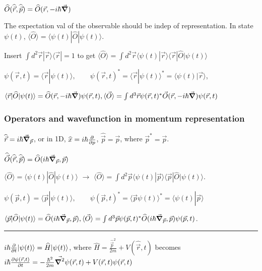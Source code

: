 $\widehat{O}(\widehat{\vec{r}}, \widehat{\vec{p}}) = \widehat{O} (\vec{r}, -i \hbar \vec{\grad})$

The expectation val of the observable should be indep of representation. In state $\psi(t)$, $\langle \widehat{O} \rangle = \langle \psi(t) | \widehat{O} | \psi(t) \rangle$.

Insert $\int d^2 \vec{r} | \vec{r} \rangle \langle \vec{r} | = 1$ to get $\langle \widehat{O} \rangle = \int d^2 \vec{r} \langle \psi(t) | \vec{r} \rangle \langle \vec{r} | \widehat{O} | \psi(t) \rangle$

$\psi(\vec{r}, t) = \langle \vec{r} | \psi(t) \rangle, \qquad \psi(\vec{r}, t)^* = \langle \vec{r} | \psi(t) \rangle^* = \langle \psi(t) | \vec{r} \rangle$,

$\langle \vec{r} | \widehat{O} | \psi(t) \rangle = \widehat{O} (\vec{r}, -i \hbar \vec{\grad}) \psi(\vec{r}, t), \langle \vec{O} \rangle = \int d^3 \vec{r} \psi(\vec{r}, t)^* \vec{O}(\vec{r}, -i \hbar \vec{\grad}) \psi(\vec{r}, t)$

\subsubsection{Operators and wavefunction in momentum representation}

$\widehat{\vec{r}} = i \hbar \vec{\grad}_{\vec{p}}$, or in 1D, $\widehat{x} = i \hbar \pdv{}{p}$, $\widehat{\vec{p}} = \vec{p}$, where $\vec{p}^* = \vec{p}$.

$\widehat{\vec{O}} (\widehat{\vec{r}}, \widehat{\vec{p}}) = \widehat{O} (i \hbar \vec{\grad}_{\vec{p}}, \vec{p})$

$\langle \widehat{O} \rangle = \langle \psi(t) | \widehat{O} | \psi(t) \rangle$ $\rightarrow$ $\langle \widehat{O} \rangle = \int d^2 \vec{p} \langle \psi(t) | \vec{p} \rangle \langle \vec{p} | \widehat{O} | \psi(t) \rangle$.

$\psi(\vec{p}, t) = \langle \vec{p} | \psi(t) \rangle, \qquad \psi(\vec{p}, t)^* = \langle \vec{p} \psi(t) \rangle^* = \langle \psi(t) | \vec{p} \rangle$

$\langle \vec{p} | \widehat{O} | \psi(t) \rangle = \widehat{O} (i \hbar \vec{\grad}_{\vec{p}}, \vec{p}), \langle \vec{O} \rangle = \int d^3 \vec{p} \psi(\vec{p}, t)^* \widehat{O}(i \hbar \vec{\grad}_{\vec{p}}, \vec{p}) \psi(\vec{p}, t)$.

\smallskip \hrule height 0.3pt

$i \hbar \pdv{}{t} | \psi(t) \rangle = \widehat{H} | \psi(t) \rangle$, where $\widehat{H} = \frac{\widehat{\vec{p}}^2}{2m} + V(\widehat{\vec{r}}, t)$ becomes $i \hbar \pdv{\psi(\vec{r}, t)}{t} = - \frac{\hbar^2}{2m} \vec{\grad^2} \psi(\vec{r}, t) + V(\vec{r}, t) \psi(\vec{r}, t)$

